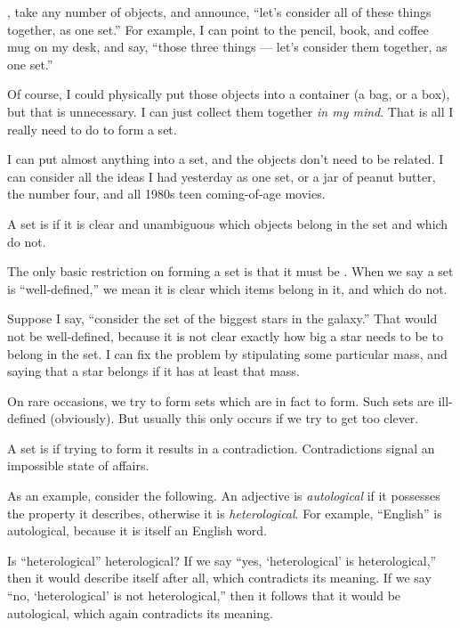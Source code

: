\documentclass[../../../main.tex]{subfiles}
\begin{document}
, take any number of objects, and announce, ``let's consider all of these things together, as one set.'' For example, I can point to the pencil, book, and coffee mug on my desk, and say, ``those three things --- let's consider them together, as one set.'' 

Of course, I could physically put those objects into a container (a bag, or a box), but that is unnecessary. I can just collect them together \emph{in my mind}. That is all I really need to do to form a set.

I can put almost anything into a set, and the objects don't need to be related. I can consider all the ideas I had yesterday as one set, or a jar of peanut butter, the number four, and all 1980s teen coming-of-age movies.

\begin{terminology}
  A set is  if it is clear and unambiguous which objects belong in the set and which do not.
\end{terminology}

The only basic restriction on forming a set is that it must be . When we say a set is ``well-defined,'' we mean it is clear which items belong in it, and which do not. 

Suppose I say, ``consider the set of the biggest stars in the galaxy.'' That would not be well-defined, because it is not clear exactly how big a star needs to be to belong in the set. I can fix the problem by stipulating some particular mass, and saying that a star belongs if it has at least that mass.

On rare occasions, we try to form sets which are in fact  to form. Such sets are ill-defined (obviously). But usually this only occurs if we try to get too clever. 

\begin{terminology}
  A set is  if trying to form it results in a contradiction. Contradictions signal an impossible state of affairs.
\end{terminology}

As an example, consider the following. An adjective is \emph{autological} if it possesses the property it describes, otherwise it is \emph{heterological}. For example, ``English'' is autological, because it is itself an English word. 

\begin{aside}
  \begin{remark}
    Is ``heterological'' heterological? If we say ``yes, `heterological' is heterological,'' then it would describe itself after all, which contradicts its meaning. If we say ``no, `heterological' is not heterological,'' then it follows that it would be autological, which again contradicts its meaning.
  \end{remark}
\end{aside}
\end{document}
